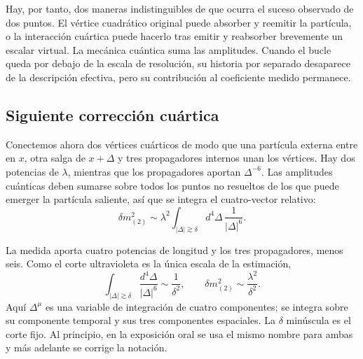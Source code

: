 Hay, por tanto, dos maneras indistinguibles de que ocurra el suceso observado de dos puntos. El vértice cuadrático original puede absorber y reemitir la partícula, o la interacción cuártica puede hacerlo tras emitir y reabsorber brevemente un escalar virtual. La mecánica cuántica suma las amplitudes. Cuando el bucle queda por debajo de la escala de resolución, su historia por separado desaparece de la descripción efectiva, pero su contribución al coeficiente medido permanece.

\subsection{Siguiente corrección cuártica}

Conectemos ahora dos vértices cuárticos de modo que una partícula externa entre en \(x\), otra salga de \(x+\Delta\) y tres propagadores internos unan los vértices. Hay dos potencias de \(\lambda\), mientras que los propagadores aportan \(\Delta^{-6}\). Las amplitudes cuánticas deben sumarse sobre todos los puntos no resueltos de los que puede emerger la partícula saliente, así que se integra el cuatro-vector relativo:
\begin{equation}
\delta m^2_{(2)}
\sim
\lambda^2
\int_{|\Delta|\gtrsim\delta}
d^4\Delta\,\frac{1}{|\Delta|^6}.
\label{eq:two-loop-power-count}
\end{equation}

\begin{classroomqa}
\end{classroomqa}

La medida aporta cuatro potencias de longitud y los tres propagadores, menos seis. Como el corte ultravioleta es la única escala de la estimación,
\begin{equation}
\int_{|\Delta|\gtrsim\delta}
\frac{d^4\Delta}{|\Delta|^6}
\sim\frac{1}{\delta^2},
\qquad
\delta m^2_{(2)}
\sim\frac{\lambda^2}{\delta^2}.
\label{eq:two-loop-scalar-mass}
\end{equation}
Aquí \(\Delta^\mu\) es una variable de integración de cuatro componentes; se integra sobre su componente temporal y sus tres componentes espaciales. La \(\delta\) minúscula es el corte fijo. Al principio, en la exposición oral se usa el mismo nombre para ambas y más adelante se corrige la notación.


